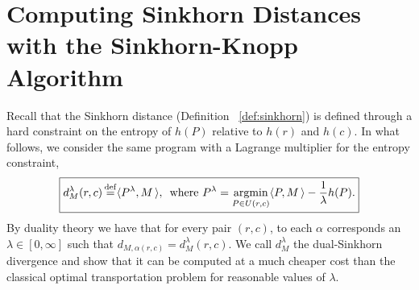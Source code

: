 \documentclass{amsart} %
\begin{document}
\section{Computing Sinkhorn Distances with the Sinkhorn-Knopp Algorithm}\label{sec:computing}
Recall that the Sinkhorn distance (Definition ~\ref{def:sinkhorn}) is  defined through a hard constraint on the entropy of $h(P)$ relative to $h(r)$ and $h(c)$.
In what follows, we consider the same program with a Lagrange multiplier for the entropy constraint,
\begin{equation}\label{eq:pen}
\boxed{d_{M}^{\lambda}(r,c) \operatorname{\overset{\operatorname{def}}{=}} \langle P^\lambda , M\,\rangle,\,\text{ where } P^\lambda=\mathop{\rm argmin}_{P\in U(r,c)} \langle P , M\,\rangle - \frac{1}{\lambda} h(P).}
\end{equation}
By duality theory we have that for every pair $(r,c)$, to each $\alpha$ corresponds an $\lambda\in[0,\infty]$ such that $d_{M,\alpha(r,c)}=d_{M}^{\lambda}(r,c)$. We call $d_{M}^\lambda$ the dual-Sinkhorn divergence and show that it can be computed at a much cheaper cost than the classical optimal transportation problem for reasonable values of $\lambda$. 
\end{document}
